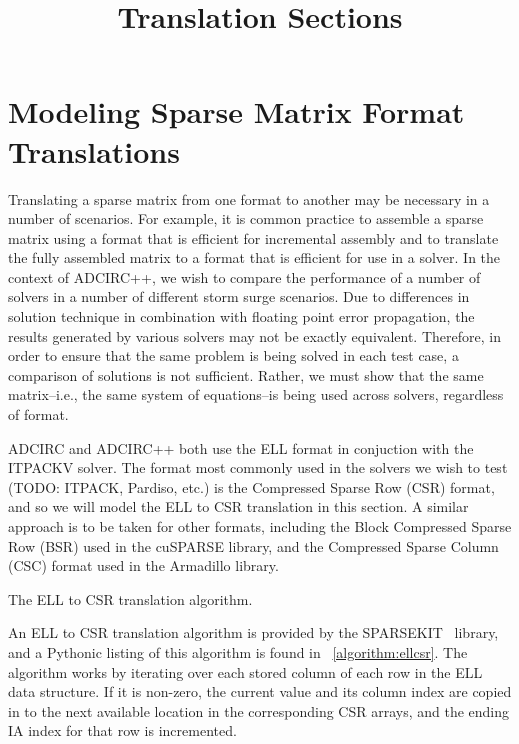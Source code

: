 \documentclass[sigconf]{acmart}
\begin{document}
\pagestyle{plain}
\title{Translation Sections}
\maketitle

\section{Modeling Sparse Matrix Format Translations}

Translating a sparse matrix from one format to another may be necessary in a number of scenarios.  For example, it is common practice to assemble a sparse matrix using a format that is efficient for incremental assembly and to translate the fully assembled matrix to a format that is efficient for use in a solver.  In the context of ADCIRC++, we wish to compare the performance of a number of solvers in a number of different storm surge scenarios.  
Due to differences in solution technique in combination with floating point error propagation, the results generated by various solvers may not be exactly equivalent.  Therefore, in order to ensure that the same problem is being solved in each test case, a comparison of solutions is not sufficient.  Rather, we must show that the same matrix--i.e., the same system of equations--is being used across solvers, regardless of format.

ADCIRC and ADCIRC++ both use the ELL format in conjuction with the ITPACKV solver.  The format most commonly used in the solvers we wish to test (TODO: ITPACK, Pardiso, etc.) is the Compressed Sparse Row (CSR) format, and so we will model the ELL to CSR translation in this section.  A similar approach is to be taken for other formats, including the Block Compressed Sparse Row (BSR) used in the cuSPARSE library, and the Compressed Sparse Column (CSC) format used in the Armadillo library.

\LinesNumbered
\begin{algorithm}

\caption{The ELL to CSR translation algorithm.}
\label{algorithm:ellcsr}
\end{algorithm}
\LinesNotNumbered

An ELL to CSR translation algorithm is provided by the SPARSEKIT~\cite{sparsekit} library, and a Pythonic listing of this algorithm is found in \figurename~\ref{algorithm:ellcsr}.  The algorithm works by iterating over each stored column of each row in the ELL data structure.  If it is non-zero, the current value and its column index are copied in to the next available location in the corresponding CSR arrays, and the ending IA index for that row is incremented.
\end{document}
